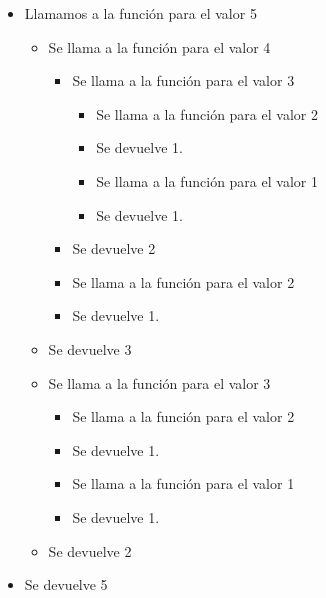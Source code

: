 \documentclass[a4paper]{article}
\begin{document}
\begin{itemize}
\item Llamamos a la función para el valor 5
    \begin{itemize}
        \item Se llama a la función para el valor 4
        \begin{itemize}
            \item Se llama a la función para el valor 3
            \begin{itemize}
                \item Se llama a la función para el valor 2
                \item Se devuelve 1.
            \end{itemize}
            \begin{itemize}
                \item Se llama a la función para el valor 1
                \item Se devuelve 1.
            \end{itemize}
            \item Se devuelve 2
        \end{itemize}
        \begin{itemize}
            \item Se llama a la función para el valor 2
            \item Se devuelve 1.
        \end{itemize}
    \item Se devuelve 3
    \end{itemize}
    \begin{itemize}
        \item Se llama a la función para el valor 3
        \begin{itemize}
            \item Se llama a la función para el valor 2
            \item Se devuelve 1.
        \end{itemize}
        \begin{itemize}
            \item Se llama a la función para el valor 1
            \item Se devuelve 1.
        \end{itemize}
        \item Se devuelve 2
    \end{itemize}
    \item Se devuelve 5
\end{itemize}
\end{document}
